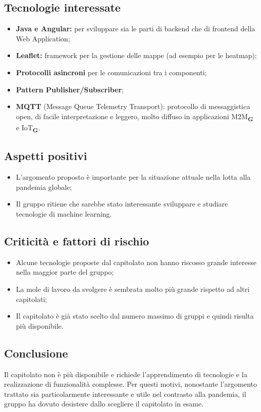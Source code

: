 \subsection{Tecnologie interessate}
\begin{itemize}
    \item \textbf{Java e Angular:} per sviluppare sia le parti di backend che di frontend della Web Application;
    \item \textbf{Leaflet:} framework per la gestione delle mappe (ad esempio per le heatmap);
    \item \textbf{Protocolli asincroni} per le comunicazioni tra i componenti;
    \item \textbf{Pattern Publisher/Subscriber};
    \item \textbf{MQTT} (Message Queue Telemetry Transport): protocollo di messaggistica open, di facile interpretazione e leggero, molto diffuso in applicazioni M2M\textsubscript{\textbf{G}} e IoT\textsubscript{\textbf{G}}.
\end{itemize}

\subsection{Aspetti positivi}
\begin{itemize}
    \item L'argomento proposto è importante per la situazione attuale nella lotta alla pandemia globale;
    \item Il gruppo ritiene che sarebbe stato interessante sviluppare e studiare tecnologie di machine learning.
\end{itemize}

\subsection{Criticità e fattori di rischio}
\begin{itemize}
    \item Alcune tecnologie proposte dal capitolato non hanno riscosso grande interesse nella maggior parte del gruppo;
    \item La mole di lavoro da svolgere è sembrata molto più grande rispetto ad altri capitolati;
    \item Il capitolato è già stato scelto dal numero massimo di gruppi e quindi risulta più disponibile.
\end{itemize}
\subsection{Conclusione}
Il capitolato non è più disponibile e richiede l'apprendimento di tecnologie e la realizzazione di funzionalità complesse. Per questi motivi,
nonostante l'argomento trattato sia particolarmente interessante e utile nel contrasto alla pandemia, il gruppo ha dovuto
desistere dallo scegliere il capitolato in esame.